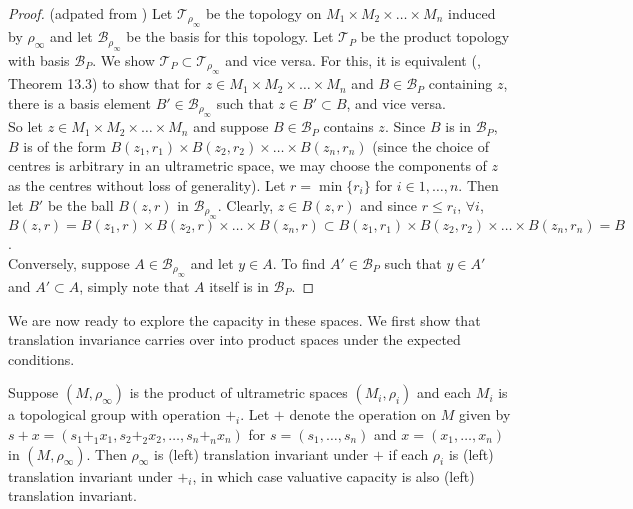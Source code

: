 \begin{proof}
	(adpated from \cite{mun}) Let $\mathcal{T}_{\rho_\infty}$ be the topology on $M_{1} \times M_{2} \times \ldots \times M_{n}$ induced by $\rho_\infty$ and let $\mathcal{B}_{\rho_\infty}$ be the basis for this topology. Let $\mathcal{T}_{P}$ be the product topology with basis $\mathcal{B}_P$. We show $\mathcal{T}_{P} \subset \mathcal{T}_{\rho_\infty}$ and vice versa. For this, it is equivalent (\cite{mun}, Theorem 13.3) to show that for $z \in  M_{1} \times M_{2} \times \ldots \times M_{n}$ and $B \in \mathcal{B}_{P}$ containing $z$, there is a basis element $B' \in \mathcal{B}_{\rho_\infty}$ such that $z \in B' \subset B$, and vice versa.\\
	
	So let  $z \in M_{1} \times M_{2} \times \ldots \times M_{n}$ and suppose $B \in \mathcal{B}_{P}$ contains $z$. Since $B$ is in $\mathcal{B}_{P}$, $B$ is of the form $B(z_1,r_1) \times B(z_2,r_2) \times \ldots \times B(z_n,r_n)$ (since the choice of centres is arbitrary in an ultrametric space, we may choose the components of $z$ as the centres without loss of generality). Let $r=\min \{r_i\}$ for $i \in 1,\ldots, n$. Then let $B'$ be the ball $B(z,r)$ in $ \mathcal{B}_{\rho_\infty}$. Clearly, $z \in B(z,r)$ and since $r \leq r_i$, $\forall i$, $B(z,r) = B(z_1,r) \times B(z_2,r) \times \ldots \times B(z_n,r) \subset  B(z_1,r_1) \times B(z_2,r_2) \times \ldots \times B(z_n,r_n) =B$.\\
	
	Conversely, suppose $A \in \mathcal{B}_{\rho_\infty}$ and let $y \in A$. To find $A' \in \mathcal{B}_{P}$ such that $y \in A'$ and $A' \subset A$, simply note that $A$ itself is in $\mathcal{B}_{P}$.
	
\end{proof}

We are now ready to explore the capacity in these spaces. We first show that translation invariance carries over into product spaces under the expected conditions.\\ 

\begin{proposition}
Suppose $(M,\rho_\infty)$ is the product of ultrametric spaces $(M_i, \rho_i)$ and each $M_i$ is a topological group with operation $+_i$. Let $+$ denote the operation on $M$ given by $s+x = (s_1 + _1 x_1, s_2 +_2 x_2, \ldots, s_n +_nx_n)$ for $s = (s_1,\ldots,s_n)$ and $x =(x_1,\ldots,x_n)$ in $(M, \rho_\infty)$. Then $\rho_\infty$ is (left) translation invariant under $+$ if each $\rho_i$ is (left) translation invariant under $+_i$, in which case valuative capacity is also (left) translation invariant.
\end{proposition}

